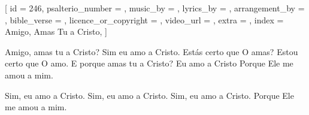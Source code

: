 
[
    id                     = {246},
    psalterio_number       = {},
    music_by               = {},
    lyrics_by              = {},
    arrangement_by         = {},
    bible_verse            = {},
    licence_or_copyright   = {},
    video_url              = {},
    extra                  = {},
    index                  = {Amigo, Amas Tu a Cristo},
]


\beginverse
Amigo, amas tu a Cristo?
Sim eu amo a Cristo.
Estás certo que O amas?
Estou certo que O amo.
E porque amas tu a Cristo?
Eu amo a Cristo
Porque Ele me amou a mim.
\endverse


\beginchorus

Sim, eu amo a Cristo.
Sim, eu amo a Cristo.
Sim, eu amo a Cristo.
Porque Ele me amou a mim.

\endchorus



\endsong
